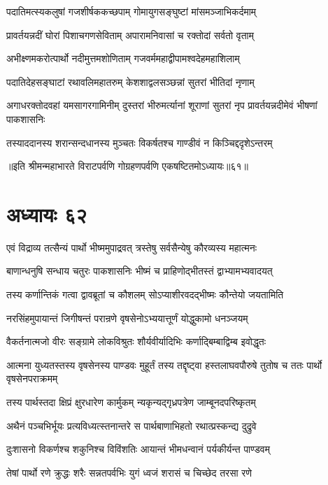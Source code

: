 \twolineshloka
{पदातिमत्स्यकलुषां गजशीर्षककच्छपाम्}
{गोमायुगसङ्घुष्टां मांसमञ्जाभिकर्दमाम्}


\twolineshloka
{प्रावर्तयन्नदीं घोरां पिशाचगणसेविताम्}
{अपारामनिवासां च रक्तोदां सर्वतो वृताम्}


\twolineshloka
{अभीक्ष्णमकरोत्पार्थो नदीमुत्तमशोणिताम्}
{गजवर्ममहाद्वीपामश्वदेहमहाशिलाम्}


\twolineshloka
{पदातिदेहसङ्घाटां रथावलिमहातरुम्}
{केशशाद्वलसञ्छन्नां सुतरां भीतिदां नृणाम्}


\threelineshloka
{अगाधरक्तोदवहां यमसागरगामिनीम्}
{दुस्तरां भीरुमर्त्यानां शूराणां सुतरां नृप}
{प्रावर्तयन्नदीमेवं भीषणां पाकशासनिः}


\twolineshloka
{तस्याददानस्य शरान्सन्दधानस्य मुञ्चतः}
{विकर्षतश्च गाण्डीवं न किञ्चिद्ददृशेऽन्तरम्}

॥इति श्रीमन्महाभारते विराटपर्वणि गोग्रहणपर्वणि एकषष्टितमोऽध्यायः॥६१॥

\chapter{अध्यायः ६२}

\twolineshloka
{एवं विद्राव्य तत्सैन्यं पार्थो भीष्ममुपाद्रवत्}
{त्रस्तेषु सर्वसैन्येषु कौरव्यस्य महात्मनः}


\twolineshloka
{बाणान्धनुषि सन्धाय चतुरः पाकशासनिः}
{भीष्मं च प्राहिणोद्भीतस्तं द्वाभ्यामभ्यवादयत्}


\twolineshloka
{तस्य कर्णान्तिकं गत्वा द्वावब्रूतां च कौशलम्}
{सोऽप्याशीरवदद्भीष्मः कौन्तेयो जयतामिति}


\twolineshloka
{नरसिंहमुपायान्तं जिगीषन्तं परान्रणे}
{वृषसेनोऽभ्ययात्तूर्णं योद्धुकामो धनञ्जयम्}


\twolineshloka
{वैकर्तनात्मजो वीरः सङ्ग्रामे लोकविश्रुतः}
{शौर्यवीर्यादिभिः कर्णाद्बिम्बाद्विम्ब इवोद्धृतः}


\threelineshloka
{आत्मना युध्यतस्तस्य वृषसेनस्य पाण्डवः}
{मुहूर्तं तस्य तद्दृष्ट्वा हस्तलाघवपौरुषे}
{तुतोष च ततः पार्थो वृषसेनपराक्रमम्}


\twolineshloka
{तस्य पार्थस्तदा क्षिप्रं क्षुरधारेण कार्मुकम्}
{न्यकृन्यद्गृध्रपत्रेण जाम्बूनदपरिष्कृतम्}


\twolineshloka
{अथैनं पञ्चभिर्भूयः प्रत्यविध्यत्स्तनान्तरे}
{स पार्थबाणाभिहतो रथात्प्रस्कन्द्य दुद्रुवे}


\twolineshloka
{दुःशासनो विकर्णश्च शकुनिश्च विविंशतिः}
{आयान्तं भीमधन्वानं पर्यकीर्यन्त पाण्डवम्}


\twolineshloka
{तेषां पार्थो रणे क्रुद्धः शरैः सन्नतपर्वभिः}
{युगं ध्वजं शरासं च चिच्छेद तरसा रणे}


